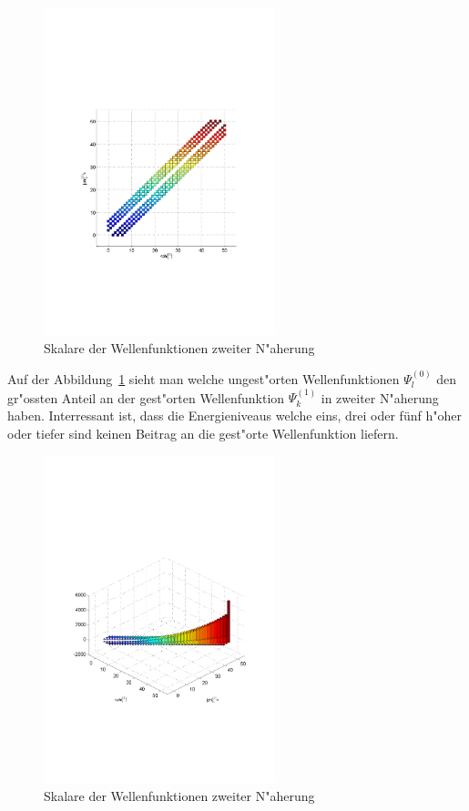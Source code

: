 \begin{refsection}
\begin{figure}[h]	%
\centering
\includegraphics[width=0.6\textwidth]{anharmonisch/images/x3/PLK21.pdf}
\caption{Skalare der Wellenfunktionen zweiter N"aherung
\label{skript:x3_PLK21}}
\end{figure}

Auf der Abbildung~\ref{skript:x3_PLK21} sieht man welche ungest"orten Wellenfunktionen $\Psi_l^{(0)}$ den gr"ossten Anteil an der gest"orten Wellenfunktion $\Psi_k^{(1)}$ in zweiter N"aherung haben. Interressant ist, dass die Energieniveaus welche eins, drei oder fünf h"oher oder tiefer sind keinen Beitrag an die gest"orte Wellenfunktion liefern.

\begin{figure}[h]	%
\centering
\includegraphics[width=0.6\textwidth]{anharmonisch/images/x3/PLK22.pdf}
\caption{Skalare der Wellenfunktionen zweiter N"aherung
\label{skript:x3_PLK22}}
\end{figure}


\end{refsection}
